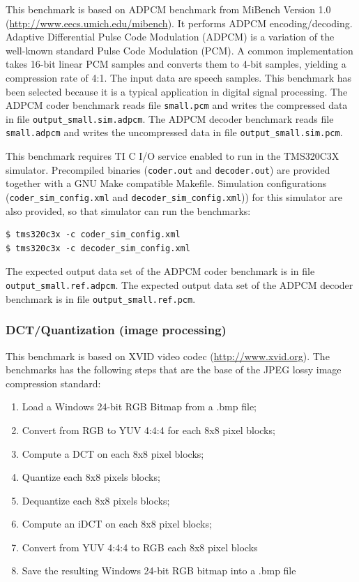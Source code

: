 This benchmark is based on ADPCM benchmark from MiBench Version 1.0 (\url{http://www.eecs.umich.edu/mibench}).
It performs ADPCM encoding/decoding. Adaptive Differential Pulse Code Modulation (ADPCM) is a variation
of the well-known standard Pulse Code Modulation (PCM). A common implementation takes 16-bit linear
PCM samples and converts them to 4-bit samples, yielding a compression rate of 4:1. The input data are speech samples.
This benchmark has been selected because it is a typical application in digital signal processing.
The ADPCM coder benchmark reads file \texttt{small.pcm} and writes the compressed data in file \texttt{output\_small.sim.adpcm}.
The ADPCM decoder benchmark reads file \texttt{small.adpcm} and writes the uncompressed data in file \texttt{output\_small.sim.pcm}.

This benchmark requires TI C I/O service enabled to run in the TMS320C3X simulator.
Precompiled binaries (\texttt{coder.out} and \texttt{decoder.out}) are provided together with a GNU Make compatible Makefile.
Simulation configurations (\texttt{coder\_sim\_config.xml} and \texttt{decoder\_sim\_config.xml})) for this simulator are also provided, so that simulator can run the benchmarks:

\begin{verbatim}
$ tms320c3x -c coder_sim_config.xml
$ tms320c3x -c decoder_sim_config.xml
\end{verbatim}

The expected output data set of the ADPCM coder benchmark is in file \texttt{output\_small.ref.adpcm}.
The expected output data set of the ADPCM decoder benchmark is in file \texttt{output\_small.ref.pcm}.

\subsubsection{DCT/Quantization (image processing)}

This benchmark is based on XVID video codec (\url{http://www.xvid.org}).
The benchmarks has the following steps that are the base of the JPEG lossy image compression standard:
\begin{enumerate}
\item Load a Windows 24-bit RGB Bitmap from a .bmp file;
\item Convert from RGB to YUV 4:4:4 for each 8x8 pixel blocks;
\item Compute a DCT on each 8x8 pixel blocks;
\item Quantize each 8x8 pixels blocks;
\item Dequantize each 8x8 pixels blocks;
\item Compute an iDCT on each 8x8 pixel blocks;
\item Convert from YUV 4:4:4 to RGB each 8x8 pixel blocks
\item Save the resulting Windows 24-bit RGB bitmap into a .bmp file
\end{enumerate}

